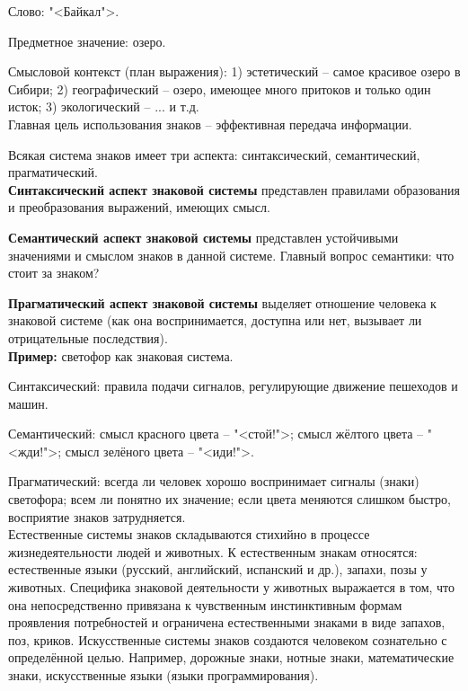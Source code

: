 \documentclass[main.tex]{subfiles}
\begin{document}
{\parindent0pt

Слово: "<Байкал">.

Предметное значение: озеро.

Смысловой контекст (план выражения):
1) эстетический -- самое красивое озеро в Сибири;
2) географический -- озеро, имеющее много притоков и только один исток;
3) экологический -- ... и т.д.
\\

Главная цель использования знаков -- эффективная передача информации.

Всякая система знаков имеет три аспекта: синтаксический, семантический, прагматический.
\\

\textbf{Синтаксический аспект знаковой системы} представлен правилами образования и преобразования выражений, имеющих смысл.

\textbf{Семантический аспект знаковой системы} представлен устойчивыми значениями и смыслом знаков в данной системе.
Главный вопрос семантики: что стоит за знаком?

\textbf{Прагматический аспект знаковой системы} выделяет отношение человека к знаковой системе (как она воспринимается, доступна или нет, вызывает ли отрицательные последствия).
\\

\textbf{Пример:} светофор как знаковая система.

Синтаксический: правила подачи сигналов, регулирующие движение пешеходов и машин.

Семантический: смысл красного цвета -- "<стой!">; смысл жёлтого цвета -- "<жди!">; смысл зелёного цвета -- "<иди!">.

Прагматический: всегда ли человек хорошо воспринимает сигналы (знаки) светофора;
всем ли понятно их значение;
если цвета меняются слишком быстро, восприятие знаков затрудняется.
\\

Естественные системы знаков складываются стихийно в процессе жизнедеятельности людей и животных.
К естественным знакам относятся: естественные языки (русский, английский, испанский и др.), запахи, позы у животных.
Специфика знаковой деятельности у животных выражается в том, что она непосредственно привязана к чувственным инстинктивным формам проявления потребностей и ограничена естественными знаками в виде запахов, поз, криков.
Искусственные системы знаков создаются человеком сознательно с определённой целью.
Например, дорожные знаки, нотные знаки, математические знаки, искусственные языки (языки программирования).

}
\end{document}
